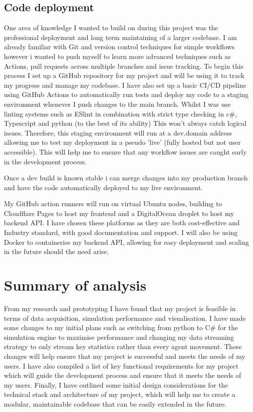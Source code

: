 \subsection{Code deployment}

One area of knowledge I wanted to build on during this project was the professional deployment and long term maintaining of a larger codebase. I am already familiar with Git and version control techniques for simple workflows however i wanted to push myself to learn more advanced techniques such as Actions, pull requests across multiple branches and issue tracking. To begin this process I set up a GitHub repository for my project and will be using it to track my progress and manage my codebase. I have also set up a basic CI/CD pipeline using GitHub Actions to automatically run tests and deploy my code to a staging environment whenever I push changes to the main branch. Whilst I was use linting systems such as ESlint in combination with strict type checking in c\#, Typescript and python (to the best of its ability) This won't always catch logical issues. Therefore, this staging environment will run at a dev.domain address allowing me to test my deployment in a pseudo 'live' (fully hosted but not user accessible). This will help me to ensure that any workflow issues are caught early in the development process.

Once a dev build is known stable i can merge changes into my production branch and have the code automatically deployed to my live environment. 

My GitHub action runners will run on virtual Ubuntu nodes, building to Cloudflare Pages to host my frontend and a DigitalOcean droplet to host my backend API. I have chosen these platforms as they are both cost-effective and Industry standard, with good documentation and support. I will also be using Docker to containerise my backend API, allowing for easy deployment and scaling in the future should the need arise.

\section{Summary of analysis}
From my research and prototyping I have found that my project is feasible in terms of data acquisition, simulation performance and visualisation. I have made some changes to my initial plans such as switching from python to C\# for the simulation engine to maximise performance and changing my data streaming strategy to only stream key statistics rather than every agent movement. These changes will help ensure that my project is successful and meets the needs of my users. I have also compiled a list of key functional requirements for my project which will guide the development process and ensure that it meets the needs of my users. Finally, I have outlined some initial design considerations for the technical stack and architecture of my project, which will help me to create a modular, maintainable codebase that can be easily extended in the future.

